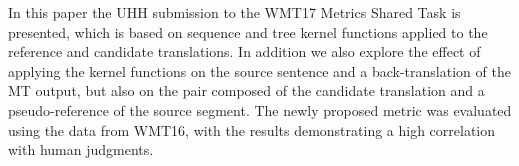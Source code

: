 In this paper the UHH submission to the WMT17 Metrics Shared Task is presented, which is based on sequence and tree kernel functions applied to the reference and candidate translations. In addition we also explore the effect of applying the kernel functions on the source sentence and a back-translation of the MT output, but also on the pair composed of the candidate translation and a pseudo-reference of the source segment. The newly proposed metric was evaluated using the data from WMT16, with the results demonstrating a high correlation with human judgments.
